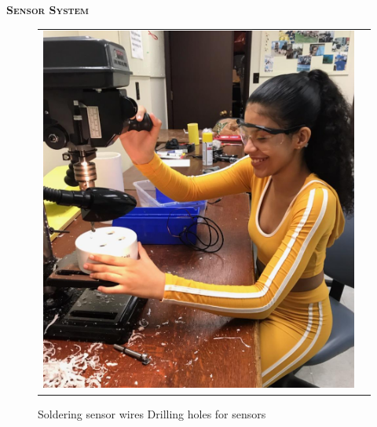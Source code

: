 \documentclass[final,t]{beamer}
\begin{document}
\begin{frame}{}
\begin{columns}
\begin{column}{.33\linewidth}
\begin{block}{\textsc{\textbf{Sensor System}}}
\begin{center}
\begin{figure}
\begin{tabular}{cc}
                    \includegraphics[scale = 0.42]{assets/meworking1}
                    \end{tabular}
                    \caption{Soldering sensor wires \hspace{30mm} Drilling holes for sensors}
                    \end{figure}
                    \end{center}

  				\end{block}


\end{column}
\end{columns}
\end{frame}
\end{document}
